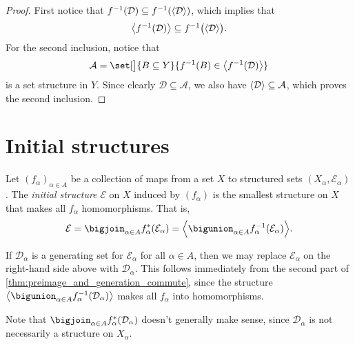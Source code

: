 \documentclass[article, a4paper, 11pt, oneside]{memoir}
\numberwithin{equation}{chapter}
\newcommand{\calE}{\mathcal{E}}
\newcommand{\calD}{\mathcal{D}}
\newcommand{\calA}{\mathcal{A}}
\DeclarePairedDelimiter{\gen}{\langle}{\rangle} %
\newcommand{\preim}{^{-1}}
\begin{document}
\begin{proof}
    First notice that $f\preim(\calD) \subseteq f\preim(\gen{\calD})$, which implies that
    \begin{equation*}
        \gen[\big]{f\preim(\calD)} \subseteq f\preim\bigl( \gen{\calD} \bigr).
    \end{equation*}
    For the second inclusion, notice that
    \begin{equation*}
        \calA = \set[\big]{B \subseteq Y}{f\preim(B) \in \gen[\big]{f\preim(\calD)}}
    \end{equation*}
    is a set structure in $Y$. Since clearly $\calD \subseteq \calA$, we also have $\gen{\calD} \subseteq \calA$, which proves the second inclusion.
\end{proof}


\section{Initial structures}

\begin{definition}
    Let $(f_\alpha)_{\alpha \in A}$ be a collection of maps from a set $X$ to structured sets $(X_\alpha, \calE_\alpha)$. The \emph{initial structure} $\calE$ on $X$ induced by $(f_\alpha)$ is the smallest structure on $X$ that makes all $f_\alpha$ homomorphisms. That is,
    \begin{equation*}
        \calE
            = \bigjoin_{\alpha \in A} f_\alpha^*(\calE_\alpha)
            = \gen[\Big]{ \bigunion_{\alpha \in A} f_\alpha\preim(\calE_\alpha) }.
    \end{equation*}
\end{definition}

\begin{remark}
    \label{rem:initial_structure_generating_set}
    If $\calD_\alpha$ is a generating set for $\calE_\alpha$ for all $\alpha \in A$, then we may replace $\calE_\alpha$ on the right-hand side above with $\calD_\alpha$. This follows immediately from the second part of \cref{thm:preimage_and_generation_commute}, since the structure $\gen[\big]{ \bigunion_{\alpha \in A} f_\alpha\preim(\calD_\alpha) }$ makes all $f_\alpha$ into homomorphisms.

    Note that $\bigjoin_{\alpha \in A} f_\alpha^*(\calD_\alpha)$ doesn't generally make sense, since $\calD_\alpha$ is not necessarily a structure on $X_\alpha$.
\end{remark}
\end{document}
